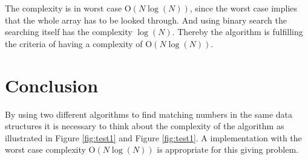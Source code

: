 The complexity is in worst case O\(\left( N\log {(N)}  \right) \), since the worst case implies that the whole array has to be looked through. And using binary search the searching itself has the complexity \( \log {(N)} \). Thereby the algorithm is fulfilling the criteria of having a complexity of O\(\left( N\log {(N)}  \right) \).  


\section{Conclusion}
By using two different algorithms to find matching numbers in the same data structures it is necessary to think about the complexity of the algorithm as illustrated in Figure \ref{fig:test1} and Figure \ref{fig:test1}. A implementation with the worst case complexity O\(\left( N\log {(N)}  \right) \) is appropriate for this giving problem.
